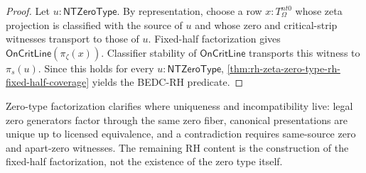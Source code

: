 \begin{proof}
Let $u:\mathsf{NTZeroType}$. By representation, choose a row
$x:T_{\Omega}^{nt0}$ whose zeta projection is classified with the source
of $u$ and whose zero and critical-strip witnesses transport to those of
$u$. Fixed-half factorization gives
$\mathsf{OnCritLine}(\pi_{\zeta}(x))$. Classifier stability of
$\mathsf{OnCritLine}$ transports this witness to $\pi_s(u)$. Since this
holds for every $u:\mathsf{NTZeroType}$,
\autoref{thm:rh-zeta-zero-type-rh-fixed-half-coverage} yields the BEDC-RH
predicate.
\end{proof}

\begin{principle}
\label{prin:rh-zeta-zero-type-factorization-status}
Zero-type factorization clarifies where uniqueness and incompatibility
live: legal zero generators factor through the same zero fiber, canonical
presentations are unique up to licensed equivalence, and a contradiction
requires same-source zero and apart-zero witnesses. The remaining RH
content is the construction of the fixed-half factorization, not the
existence of the zero type itself.
\end{principle}


